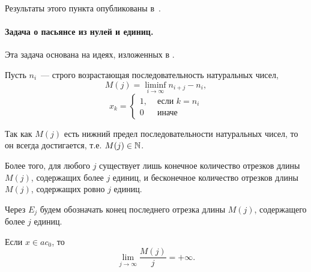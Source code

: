 Результаты этого пункта опубликованы в~\cite{our-mz2019ac0}.

\paragraph{Задача о пасьянсе из нулей и единиц.}

Эта задача основана на идеях, изложенных в \cite[\S 5]{Semenov2014geomprops}.

Пусть $n_i$~--- строго возрастающая последовательность натуральных чисел,
\begin{equation}
	\label{eq:definition_M_j}
	M(j) = \liminf_{i\to\infty} n_{i+j} - n_i,
\end{equation}
\begin{equation}
	x_k = \left\{\begin{array}{ll}
		1, & \mbox{~если~} k = n_i
		\\
		0  & \mbox{~иначе~}
	\end{array}\right.
\end{equation}

Так как $M(j)$ есть нижний предел последовательности натуральных чисел,
то он всегда достигается,
т.е. $M(j)\in\mathbb{N}$.

Более того, для любого $j$ существует лишь конечное количество отрезков длины $M(j)$,
содержащих более $j$ единиц,
и бесконечное количество отрезков длины $M(j)$,
содержащих ровно $j$ единиц.

Через $E_j$ будем обозначать конец последнего отрезка длины $M(j)$,
содержащего более $j$ единиц.

\begin{lemma}
	\label{thm:lim_M(j)/j_neobh}
	Если $x \in ac_0$, то
	\begin{equation}\label{lim_M(j)/j}
		\lim_{j \to \infty} \frac{M(j)}{j} = +\infty
		.
	\end{equation}
\end{lemma}

